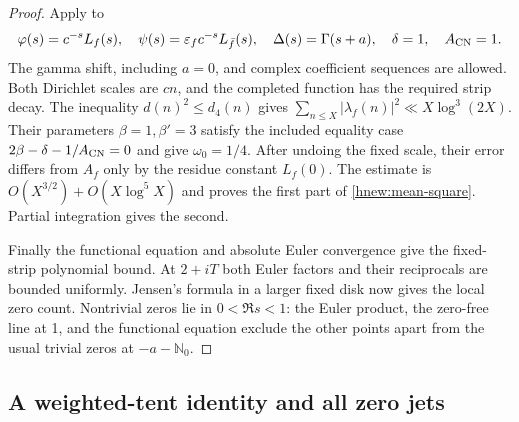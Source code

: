 \begin{proof}
Apply \citet[Theorem~1, p.~62, equation~(57), with setup on
pp.~43--44]{chandrasekharannar1964} to
\[
 \varphi(s)=c^{-s}L_f(s),\quad
 \psi(s)=\varepsilon_fc^{-s}L_{\bar f}(s),\quad
 \Delta(s)=\Gamma(s+a),\quad\delta=1,\quad A_{\rm CN}=1.
\]
The gamma shift, including $a=0$, and complex coefficient
sequences are allowed.  Both Dirichlet scales are $cn$, and
the completed function has the required strip decay.
The inequality $d(n)^2\le d_4(n)$ gives
$\sum_{n\le X}|\lambda_f(n)|^2\ll X\log^3(2X)$.
Their parameters $\beta=1,\beta'=3$ satisfy the included equality
case $2\beta-\delta-1/A_{\rm CN}=0$ and give $\omega_0=1/4$.
After undoing the fixed scale, their error differs from $A_f$
only by the residue constant $L_f(0)$.
The estimate is $O(X^{3/2})+O(X\log^5X)$ and proves the first
part of \eqref{hnew:mean-square}.  Partial integration gives the second.

Finally the functional equation and absolute Euler convergence give
the fixed-strip polynomial bound.  At $2+iT$ both Euler factors
and their reciprocals are bounded uniformly.
Jensen's formula in a larger fixed disk now gives the local zero
count.  Nontrivial zeros lie in $0<\Re s<1$: the Euler product,
the zero-free line at 1, and the functional equation exclude the
other points apart from the usual trivial zeros at $-a-\mathbb N_0$.
\end{proof}

\subsection{A weighted-tent identity and all zero jets}

